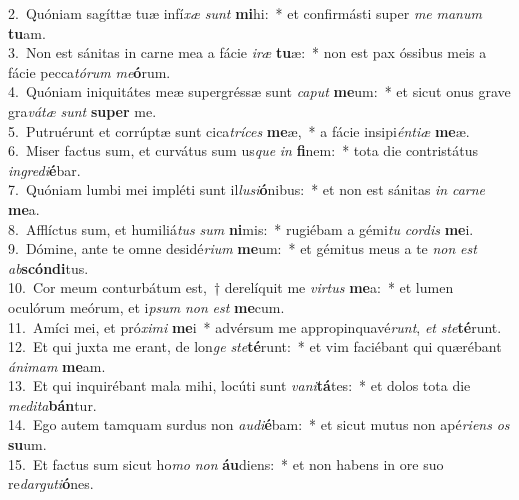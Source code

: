 {2.~}Quóniam sagíttæ tuæ infí\textit{xæ} \textit{sunt} \textbf{mi}hi:~* et confirmásti super \textit{me} \textit{ma}\textit{num} \textbf{tu}am.\\
{3.~}Non est sánitas in carne mea a fácie \textit{i}\textit{ræ} \textbf{tu}æ:~* non est pax óssibus meis a fácie pecca\textit{tó}\textit{rum} \textit{me}\textbf{ó}rum.\\
{4.~}Quóniam iniquitátes meæ supergréssæ sunt \textit{ca}\textit{put} \textbf{me}um:~* et sicut onus grave gra\textit{vá}\textit{tæ} \textit{sunt} \textbf{su}\textbf{per} me.\\
{5.~}Putruérunt et corrúptæ sunt cica\textit{trí}\textit{ces} \textbf{me}æ,~* a fácie insipi\textit{én}\textit{ti}\textit{æ} \textbf{me}æ.\\
{6.~}Miser factus sum, et curvátus sum us\textit{que} \textit{in} \textbf{fi}nem:~* tota die contristátus \textit{in}\textit{gre}\textit{di}\textbf{é}bar.\\
{7.~}Quóniam lumbi mei impléti sunt il\textit{lu}\textit{si}\textbf{ó}nibus:~* et non est sánitas \textit{in} \textit{car}\textit{ne} \textbf{me}a.\\
{8.~}Afflíctus sum, et humiliá\textit{tus} \textit{sum} \textbf{ni}mis:~* rugiébam a gémi\textit{tu} \textit{cor}\textit{dis} \textbf{me}i.\\
{9.~}Dómine, ante te omne desidé\textit{ri}\textit{um} \textbf{me}um:~* et gémitus meus a te \textit{non} \textit{est} \textit{ab}\textbf{scón}\textbf{di}tus.\\
{10.~}Cor meum conturbátum est,~† derelíquit me \textit{vir}\textit{tus} \textbf{me}a:~* et lumen oculórum meórum, et i\textit{psum} \textit{non} \textit{est} \textbf{me}cum.\\
{11.~}Amíci mei, et pró\textit{xi}\textit{mi} \textbf{me}i~* advérsum me appropinquavé\textit{runt}, \textit{et} \textit{ste}\textbf{té}runt.\\
{12.~}Et qui juxta me erant, de lon\textit{ge} \textit{ste}\textbf{té}runt:~* et vim faciébant qui quærébant \textit{á}\textit{ni}\textit{mam} \textbf{me}am.\\
{13.~}Et qui inquirébant mala mihi, locúti sunt \textit{va}\textit{ni}\textbf{tá}tes:~* et dolos tota die \textit{me}\textit{di}\textit{ta}\textbf{bán}tur.\\
{14.~}Ego autem tamquam surdus non \textit{au}\textit{di}\textbf{é}bam:~* et sicut mutus non apé\textit{ri}\textit{ens} \textit{os} \textbf{su}um.\\
{15.~}Et factus sum sicut ho\textit{mo} \textit{non} \textbf{áu}diens:~* et non habens in ore suo re\textit{dar}\textit{gu}\textit{ti}\textbf{ó}nes.\\
